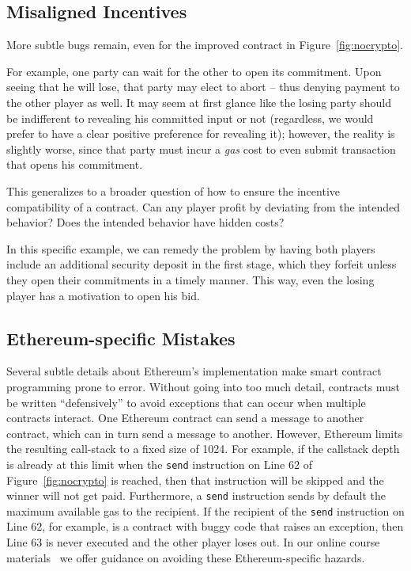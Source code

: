 \documentclass{llncs}
\begin{document}
\subsection{Misaligned Incentives}
\label{sec:incentive}
More subtle bugs remain, even for the improved contract in Figure~\ref{fig:nocrypto}.

For example, one party can 
wait for the other to open its commitment. Upon
seeing that he will lose, that party may elect
to abort -- thus denying payment
to the other player as well. 
It may seem at first glance like the losing party should be indifferent to revealing his committed input or not (regardless, we would prefer to have a clear positive preference for revealing it); however, the reality is slightly worse, since that party must incur a \emph{gas} cost to even submit transaction that opens his commitment.

This generalizes to a broader question of how to 
ensure the incentive compatibility of a contract.
Can any player profit by deviating from the intended behavior?
Does the intended behavior have hidden costs?

In this specific example, we can remedy the problem
by having both players include an additional security deposit in the first stage,
which they forfeit unless they open their commitments in a timely manner.
This way, even the losing player has a motivation to open his bid.

\subsection{Ethereum-specific Mistakes}
Several subtle details about Ethereum's implementation make smart contract programming prone to error. Without going into too much detail, contracts must be written ``defensively'' to avoid exceptions that can occur when multiple contracts interact. One Ethereum contract can send a message to another contract, which can in turn send a message to another. However, Ethereum limits the resulting call-stack to a fixed size of 1024. For example, if the callstack depth is already at this limit when the \texttt{send} instruction on Line 62 of Figure~\ref{fig:nocrypto} is reached, then that instruction will be skipped and the winner will not get paid. Furthermore, a \texttt{send} instruction sends by default the maximum available gas to the recipient. If the recipient of the \texttt{send} instruction on Line 62, for example, is a contract with buggy code that raises an exception, then Line 63 is never executed and the other player loses out. In our online course materials~\cite{anonymousethlab} we offer guidance on avoiding these Ethereum-specific hazards.
\end{document}
